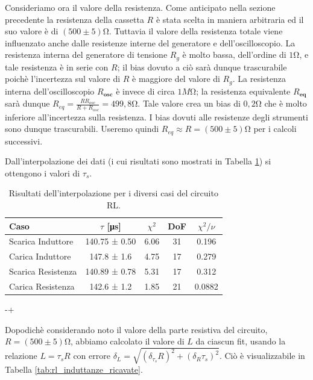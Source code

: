 \documentclass[a4paper]{article}
\begin{document}
Consideriamo ora il valore della resistenza. Come anticipato nella sezione precedente la resistenza della cassetta $R$ è stata scelta in maniera arbitraria ed il suo valore è di $(500\pm5)\si{\ohm}$. Tuttavia il valore della resistenza totale viene influenzato anche dalle resistenze interne del generatore e dell'oscilloscopio. La resistenza interna del generatore di tensione $R_g$ è molto bassa, dell'ordine di $1\si{\ohm}$, e tale resistenza è in serie con $R$; il bias dovuto a ciò sarà dunque trascurabile poichè l'incertezza sul valore di $R$ è maggiore del valore di $R_g$. La resistenza interna dell'oscilloscopio $R_\textbf{osc}$ è invece di circa $1M\si{\ohm}$; la resistenza equivalente $R_{\textbf{eq}}$ sarà dunque $R_{eq}=\frac{RR_{osc}}{R+R_{osc}}=499,8\si{\ohm}$. Tale valore crea un bias di $0,2\si{\ohm}$ che è molto inferiore all'incertezza sulla resistenza. I bias dovuti alle resistenze degli strumenti sono dunque trascurabili. Useremo quindi $R_{eq} \approx R = (500 \pm 5)\si{\ohm}$ per i calcoli successivi.


Dall'interpolazione dei dati (i cui risultati sono mostrati in Tabella \ref{tab:rl_fit_results}) si ottengono i valori di $\tau_s$.

\begin{table}[htbp]
\centering
\begin{tabular}{|l|cccc|} %
\hline
Caso & $\tau$ [\si{\micro s}] & $\chi^2$ & DoF & $\chi^2/\nu$ \\ %
\hline\hline
Scarica Induttore & 140.75 ± 0.50 & 6.06 & 31 & 0.196 \\
Carica Induttore  & 147.8 ± 1.6   & 4.75 & 17 & 0.279 \\
Scarica Resistenza& 140.89 ± 0.78 & 5.31 & 17 & 0.312 \\
Carica Resistenza & 142.6 ± 1.2   & 1.85 & 21 & 0.0882 \\
\hline
\end{tabular}
\caption{Risultati dell'interpolazione per i diversi casi del circuito RL.}
\label{tab:rl_fit_results}
\end{table}


-+

Dopodichè considerando noto il valore della parte resistiva del circuito, $R = (500 \pm 5)\si{\ohm}$, abbiamo calcolato il valore di $L$ da ciascun fit, usando la relazione \(L = \tau_s R\) con errore $\delta_L = \sqrt{(\delta_{\tau_s}R)^2 + (\delta_{R}\tau_s)^2}$. Ciò è visualizzabile in Tabella \ref{tab:rl_induttanze_ricavate}.
\end{document}
